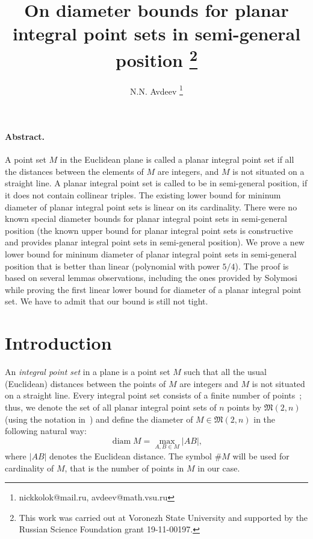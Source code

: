 \documentclass[a4paper,14pt]{article} %
\theoremstyle{plain}
\theoremstyle{definition}
\begin{document}

\title{
	On diameter bounds for planar integral point sets in semi-general position
	\footnote{
		This work was carried out at Voronezh State University and supported by the Russian Science
		Foundation grant 19-11-00197.
	}
}

\author{
	N.N. Avdeev
	\footnote{nickkolok@mail.ru, avdeev@math.vsu.ru}
}

\maketitle

\paragraph{Abstract.}
A point set $M$ in the Euclidean plane is called a planar integral point set if all the distances between the
elements of $M$ are integers, and $M$ is not situated on a straight line.
A planar integral point set is called to be in semi-general position, if it does not contain collinear triples.
The existing lower bound for mininum diameter of planar integral point sets is linear on its cardinality.
There were no known special diameter bounds for planar integral point sets in semi-general position
(the known upper bound for planar integral point sets is constructive
and provides planar integral point sets in semi-general position).
We prove a new lower bound for mininum diameter of planar integral point sets in semi-general position
that is better than linear (polynomial with power $5/4$).
The proof is based on several lemmas observations, including the ones provided by Solymosi
while proving the first linear lower bound for diameter of a planar integral point set.
We have to admit that our bound is still not tight.





\section{Introduction}



An \textit{integral point set} in a plane is a point set $M$ such that all the usual (Euclidean) distances between the
points of $M$ are integers and $M$ is not situated on a straight line.
Every integral point set consists of a finite number of points~\cite{anning1945integral,erdos1945integral};
thus, we denote the set of all planar integral point sets of $n$ points by
$\mathfrak{M}(2,n)$ (using the notation in~\cite{our-vmmsh-2018})
and define the diameter of $M\in\mathfrak{M}(2,n)$ in the following natural way:
\begin{equation}
	\operatorname{diam} M = \max_{A,B\in M} |AB|
	,
\end{equation}
where $|AB|$ denotes the Euclidean distance.
The symbol $\# M$ will be used for cardinality of $M$, that is the number of points in $M$ in our case.
\end{document}
